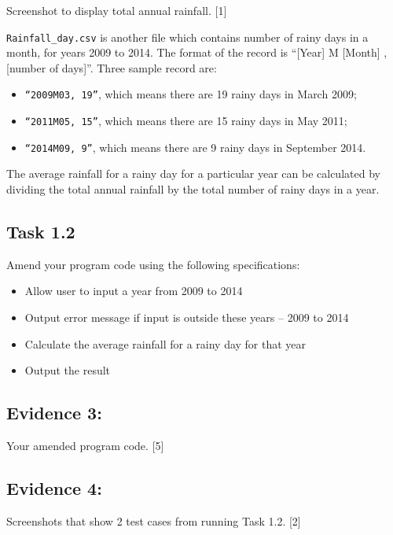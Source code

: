 Screenshot to display total annual rainfall. \hfill{}{[}1{]}

\texttt{Rainfall\_day.csv} is another file which contains number of
rainy days in a month, for years 2009 to 2014. The format of the record
is \textquotedblleft {[}Year{]} M {[}Month{]} , {[}number of days{]}\textquotedblright .
Three sample record are: 
\begin{itemize}
\item \texttt{\textquotedblleft 2009M03, 19\textquotedblright }, which means
there are 19 rainy days in March 2009;
\item \texttt{\textquotedblleft 2011M05, 15\textquotedblright }, which means
there are 15 rainy days in May 2011; 
\item \texttt{\textquotedblleft 2014M09, 9\textquotedblright }, which means
there are 9 rainy days in September 2014. 
\end{itemize}
The average rainfall for a rainy day for a particular year can be
calculated by dividing the total annual rainfall by the total number
of rainy days in a year. 

\subsection*{Task 1.2 }

Amend your program code using the following specifications: 
\begin{itemize}
\item Allow user to input a year from 2009 to 2014
\item Output error message if input is outside these years -- 2009 to 2014
\item Calculate the average rainfall for a rainy day for that year
\item Output the result 
\end{itemize}

\subsection*{Evidence 3:}

Your amended program code. \hfill{}{[}5{]}

\subsection*{Evidence 4: }

Screenshots that show 2 test cases from running Task 1.2. \hfill{}{[}2{]}